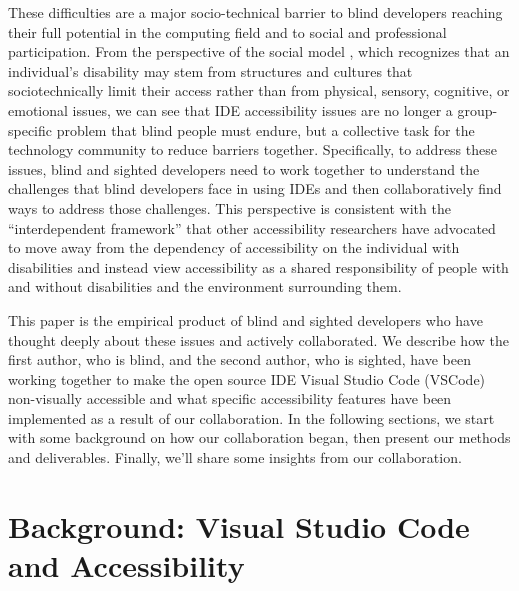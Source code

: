 \documentclass[sigconf]{acmart}
\begin{document}
These difficulties are a major socio-technical barrier to blind
developers reaching their full potential in the computing field and to
social and professional participation. From the perspective of the
social model \citep{oliverSocialModelDisability2013}, which recognizes
that an individual's disability may stem from structures and cultures
that sociotechnically limit their access rather than from physical,
sensory, cognitive, or emotional issues, we can see that IDE
accessibility issues are no longer a group-specific problem that blind
people must endure, but a collective task for the technology community
to reduce barriers together. Specifically, to address these issues,
blind and sighted developers need to work together to understand the
challenges that blind developers face in using IDEs and then
collaboratively find ways to address those challenges. This perspective
is consistent with the ``interdependent framework''
\citep{bennettInterdependenceFrameAssistive2018, degreefInterdependentVariablesRemotely2021}
that other accessibility researchers have advocated to move away from
the dependency of accessibility on the individual with disabilities and
instead view accessibility as a shared responsibility of people with and
without disabilities and the environment surrounding them.

This paper is the empirical product of blind and sighted developers who
have thought deeply about these issues and actively collaborated. We
describe how the first author, who is blind, and the second author, who
is sighted, have been working together to make the open source IDE
Visual Studio Code (VSCode) non-visually accessible and what specific
accessibility features have been implemented as a result of our
collaboration. In the following sections, we start with some background
on how our collaboration began, then present our methods and
deliverables. Finally, we'll share some insights from our collaboration.

\hypertarget{sec-vscode_a11y}{%
\section{Background: Visual Studio Code and
Accessibility}\label{sec-vscode_a11y}}
\end{document}
